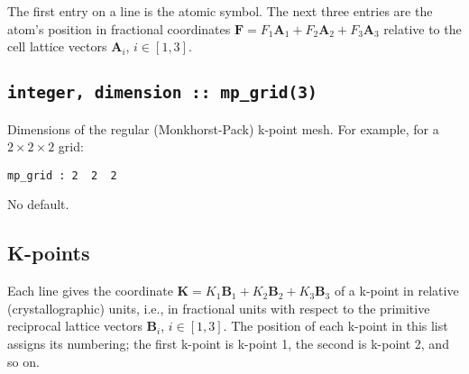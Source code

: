 The first entry on a line is the atomic symbol. The next three entries
are the atom's position in fractional coordinates $\mathbf{F} = F_1
\mathbf{A}_{1} + F_2 \mathbf{A}_{2} + F_3 \mathbf{A}_{3}$
relative to the cell lattice vectors $\mathbf{A}_i$, $i\in [1,3]$.

\subsection[mp\_grid]{\tt integer, dimension :: mp\_grid(3)}
Dimensions of the regular (Monkhorst-Pack) k-point mesh. For example,
for a $2\times2\times2$ grid:

\verb#mp_grid : 2  2  2#

No default.


%
%
%
%
%

%


\subsection[Kpoints]{K-points}
Each line gives the coordinate $\mathbf{K}=K_1 \mathbf{B}_{1} + K_2
\mathbf{B}_{2} + K_3 \mathbf{B}_3$ of a k-point
in relative (crystallographic) units, i.e., in fractional units with
respect to the primitive reciprocal lattice vectors $\mathbf{B}_{i}$,
$i \in [1,3]$. The position  of each
k-point in this list assigns its numbering; the first k-point is
k-point 1, the second is k-point 2, and so on.


